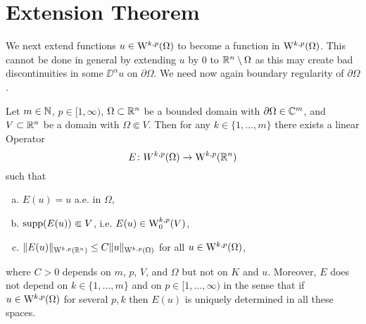 \section{Extension Theorem}

We next extend functions $u \in \mathrm{W}^{k,p}(\Omega)$ to become a function in $\mathrm{W}^{k,p}(\Omega)$.
This cannot be done in general by extending $u$ by $0$ to $\mathbb{R}^n \setminus \Omega$ as this may create bad discontinuities in some $\DD^\alpha u$ on $\partial\Omega$.
We need now again boundary regularity of $\partial\Omega$.

\begin{thm}  
  \label{thm:extension}
  Let $m \in \mathbb{N}$, $p \in [1,\infty)$, $\Omega \subset \mathbb{R}^n$ be a bounded domain with $\partial \Omega \in \mathbb{C}^m$, and $V \subset \mathbb{R}^n$ be a domain with $\Omega \Subset V$.
  Then for any $k \in \{1,\dots,m\}$ there exists a linear Operator
  $$
  E \colon W^{k,p}(\Omega) \to \mathrm{W}^{k,p}(\mathbb{R}^n)
  $$
  such that
  \begin{enumerate}[a)]
    \item $E(u) = u$ a.e. in $\Omega$,
    \item $\operatorname{supp}(E(u)) \Subset V$, i.e. $E(u) \in \mathrm{W}_0^{k,p}(V)$,
    \item $\|E(u)\|_{\mathrm{W}^{k,p}(\mathbb{R}^n)} \leq C\| u\|_{\mathrm{W}^{k,p}(\Omega)}$ for all $u \in \mathrm{W}^{k,p}(\Omega)$,
  \end{enumerate}
  where $C > 0$ depends on $m$, $p$, $V$, and $\Omega$ but not on $K$ and $u$.
  Moreover, $E$ does not depend on $k \in\{1,\dots,m\}$ and on $p \in [1,\dots,\infty)$ in the sense that if $u \in \mathrm{W}^{k,p}(\Omega)$ for several $p,k$ then $E(u)$ is uniquely determined in all these spaces.
\end{thm}


